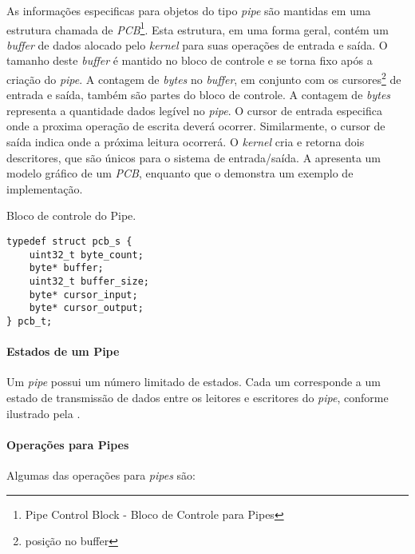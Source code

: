 As informações especificas para objetos do tipo \emph{pipe} são mantidas em uma estrutura chamada de \emph{PCB}\footnote{Pipe Control Block - Bloco de Controle para Pipes}. Esta estrutura, em uma forma geral, contém um \emph{buffer} de dados alocado pelo \emph{kernel} para suas operações de entrada e saída. O tamanho deste \emph{buffer} é mantido no bloco de controle e se torna fixo após a criação do \emph{pipe}. A contagem de \emph{bytes} no \emph{buffer}, em conjunto com os cursores\footnote{posição no buffer} de entrada e saída, também são partes do bloco de controle. A contagem de \emph{bytes} representa a quantidade dados legível no \emph{pipe}. O cursor de entrada especifica onde a proxima operação de escrita deverá ocorrer. Similarmente, o cursor de saída indica onde a próxima leitura ocorrerá. O \emph{kernel} cria e retorna dois descritores, que são únicos para o sistema de entrada/saída. A  apresenta um modelo gráfico de um \emph{PCB}, enquanto que o  demonstra um exemplo de implementação.


\begin{listing}
	\caption{Bloco de controle do Pipe.}
	\label{alg:pipes_pcb}
	\centering
	\begin{verbatim}
typedef struct pcb_s {
	uint32_t byte_count;
	byte* buffer;
	uint32_t buffer_size;
	byte* cursor_input;
	byte* cursor_output;	
} pcb_t;
	\end{verbatim}
\end{listing}

\paragraph{Estados de um Pipe}

Um \emph{pipe} possui um número limitado de estados. Cada um corresponde a um estado de transmissão de dados entre os leitores e escritores do \emph{pipe}, conforme ilustrado pela .


\paragraph{Operações para Pipes}

Algumas das operações para \emph{pipes} são:

